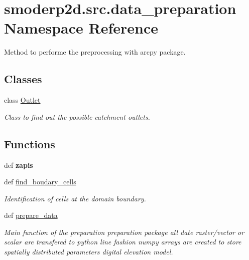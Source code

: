 \hypertarget{namespacesmoderp2d_1_1src_1_1data__preparation}{\section{smoderp2d.\-src.\-data\-\_\-preparation Namespace Reference}
\label{namespacesmoderp2d_1_1src_1_1data__preparation}
}


Method to performe the preprocessing with arcpy package.  


\subsection*{Classes}
\begin{DoxyCompactItemize}
\item 
class \hyperlink{classsmoderp2d_1_1src_1_1data__preparation_1_1Outlet}{Outlet}
\begin{DoxyCompactList}\small\item\em Class to find out the possible catchment outlets. \end{DoxyCompactList}\end{DoxyCompactItemize}
\subsection*{Functions}
\begin{DoxyCompactItemize}
\item 
\hypertarget{namespacesmoderp2d_1_1src_1_1data__preparation_a01c4fc4eacfb39b9e7f1f636ad1053a8}{def {\bfseries zapis}}\label{namespacesmoderp2d_1_1src_1_1data__preparation_a01c4fc4eacfb39b9e7f1f636ad1053a8}

\item 
def \hyperlink{namespacesmoderp2d_1_1src_1_1data__preparation_a32f7109b150f5af13b8087e8bb3213d2}{find\-\_\-boudary\-\_\-cells}
\begin{DoxyCompactList}\small\item\em Identification of cells at the domain boundary. \end{DoxyCompactList}\item 
def \hyperlink{namespacesmoderp2d_1_1src_1_1data__preparation_abe49c44911df9f3510eaad8751feab27}{prepare\-\_\-data}
\begin{DoxyCompactList}\small\item\em Main function of the preparation preparation package all date raster/vector or scalar are transfered to python line fashion numpy arrays are created to store spatially distributed parameters digital elevation model. \end{DoxyCompactList}\end{DoxyCompactItemize}


